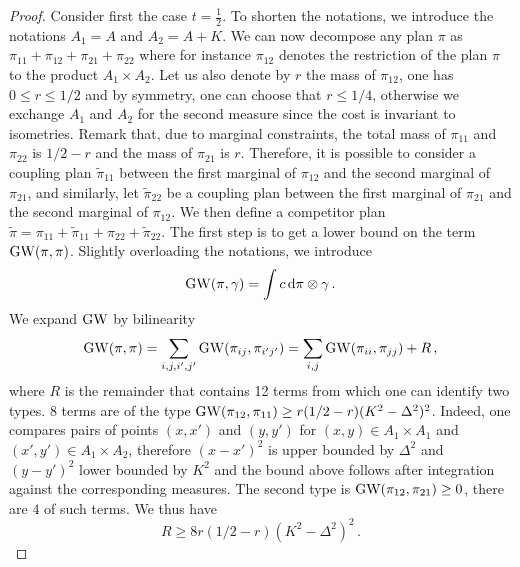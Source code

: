             \begin{proof}
            Consider first the case $t = \frac{1}{2}$.
            To shorten the notations, we introduce the notations $A_1 = A$ and $A_2 = A+K$. We can now decompose any plan $\pi$ as $\pi_{11} + \pi_{12} + \pi_{21} + \pi_{22}$ where for instance $\pi_{12}$ denotes the restriction of the plan $\pi$ to the product $A_1 \times A_2$. Let us also denote by $r$ the mass of $\pi_{12}$, one has $0 \leq r\leq 1/2$ and by symmetry, one can choose that $r\leq 1/4$, otherwise we exchange $A_1$ and $A_2$ for the second measure since the cost is invariant to isometries. Remark that, due to marginal constraints, the total mass of $\pi_{11}$ and $\pi_{22}$ is $1/2 - r$ and the mass of $\pi_{21}$ is $r$. Therefore, it is possible to consider a coupling plan $\tilde \pi_{11}$ between the first marginal of $\pi_{12}$ and the second marginal of $\pi_{21}$, and similarly, let $\tilde \pi_{22}$ be a coupling plan between the first marginal of $\pi_{21}$ and the second marginal of $\pi_{12}$. We then define a competitor plan
            $\tilde \pi  = \pi_{11} + \tilde \pi_{11} + \pi_{22} + \tilde \pi_{22}$. The first step is to get a lower bound on the term $\operatorname{GW}(\pi,\pi)$.
            Slightly overloading the notations, we introduce
            \begin{equation}\label{EqBilinearGW}
            \operatorname{GW}(\pi,\gamma) = \int c \,\mathrm d \pi \otimes \gamma\,.
            \end{equation}
            We expand $\operatorname{GW}$ by bilinearity
            \begin{equation*}
            \operatorname{GW}(\pi,\pi) = \sum_{i,j,i',j'}  \operatorname{GW}(\pi_{ij},\pi_{i'j'}) = \sum_{i,j} \operatorname{GW}(\pi_{ii},\pi_{jj}) + R\,,
            \end{equation*}
            where $R$ is the remainder that contains 12 terms from which one can identify two types. 8 terms are of the type $\operatorname{GW}(\pi_{12},\pi_{11}) \geq r(1/2-r)(K^2 - \Delta^2)^2$. Indeed, one compares pairs of points $(x,x')$ and $(y,y')$ for $(x,y) \in A_1 \times A_1$ and $(x',y') \in A_1 \times A_2$, therefore $(x - x')^2$ is upper bounded by $\Delta^2$ and $(y - y')^2$ lower bounded by $K^2$ and the bound above follows after integration against the corresponding measures.
            The second type is
            $\operatorname{GW}(\pi_{12},\pi_{21}) \geq 0$, there are $4$ of such terms. We thus have
            \begin{equation*}
            R \geq 8 r(1/2-r)(K^2 - \Delta^2)^2\,.
            \end{equation*}

\end{proof}
